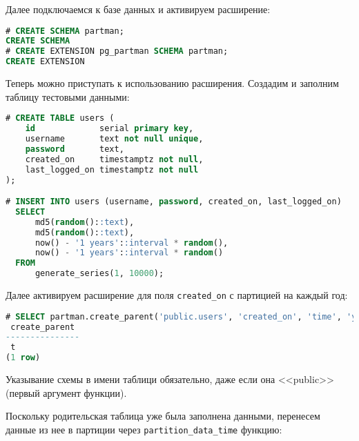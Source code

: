 Далее подключаемся к базе данных и активируем расширение:

\begin{lstlisting}[language=SQL,label=lst:pgpartman4,caption=Настройка расширения]
# CREATE SCHEMA partman;
CREATE SCHEMA
# CREATE EXTENSION pg_partman SCHEMA partman;
CREATE EXTENSION
\end{lstlisting}

Теперь можно приступать к использованию расширения. Создадим и заполним таблицу тестовыми данными:

\begin{lstlisting}[language=SQL,label=lst:pgpartman5,caption=Данные]
# CREATE TABLE users (
    id             serial primary key,
    username       text not null unique,
    password       text,
    created_on     timestamptz not null,
    last_logged_on timestamptz not null
);

# INSERT INTO users (username, password, created_on, last_logged_on)
  SELECT
      md5(random()::text),
      md5(random()::text),
      now() - '1 years'::interval * random(),
      now() - '1 years'::interval * random()
  FROM
      generate_series(1, 10000);
\end{lstlisting}

Далее активируем расширение для поля \lstinline!created_on! с партицией на каждый год:

\begin{lstlisting}[language=SQL,label=lst:pgpartman6,caption=Партицирование]
# SELECT partman.create_parent('public.users', 'created_on', 'time', 'yearly');
 create_parent
---------------
 t
(1 row)
\end{lstlisting}

Указывание схемы в имени таблици обязательно, даже если она <<public>> (первый аргумент функции).

Поскольку родительская таблица уже была заполнена данными, перенесем данные из нее в партиции через \lstinline!partition_data_time! функцию:

